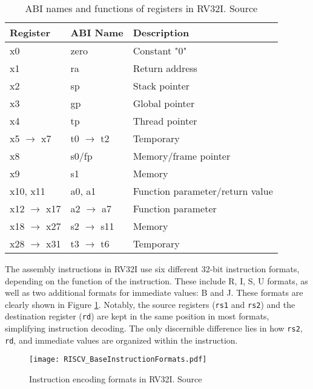 \begin{table}[h!]
    \centering
    \caption{ABI names and functions of registers in RV32I. Source \cite{riscv:manual:user:2024}}
    \label{tab:rv32i_registers}
    \begin{tabular}{lll}
    \toprule
    Register & ABI Name & Description \\
    \midrule
    x0 & zero & Constant "0" \\
    x1 & ra & Return address \\
    x2 & sp & Stack pointer \\
    x3 & gp & Global pointer \\
    x4 & tp & Thread pointer \\
    x5 $\to$ x7 & t0 $\to$ t2 & Temporary \\
    x8 & s0/fp & Memory/frame pointer \\
    x9 & s1 & Memory \\
    x10, x11 & a0, a1 & Function parameter/return value \\
    x12 $\to$ x17 & a2 $\to$ a7 & Function parameter \\
    x18 $\to$ x27 & s2 $\to$ s11 & Memory \\
    x28 $\to$ x31 & t3 $\to$ t6 & Temporary \\
    \bottomrule
    \end{tabular}
\end{table}

The assembly instructions in RV32I use six different 32-bit instruction formats, depending on the function of the instruction. These include R, I, S, U formats, as well as two additional formats for immediate values: B and J. These formats are clearly shown in Figure \ref{fig:rv32i_formats}. Notably, the source registers (\texttt{rs1} and \texttt{rs2}) and the destination register (\texttt{rd}) are kept in the same position in most formats, simplifying instruction decoding. The only discernible difference lies in how \texttt{rs2}, \texttt{rd}, and immediate values are organized within the instruction.

\begin{figure}[h!]
    \centering
    \texttt{[image: RISCV\_BaseInstructionFormats.pdf]}
    \caption{Instruction encoding formats in RV32I. Source \cite{riscv:manual:user:2024}}
    \label{fig:rv32i_formats}
\end{figure}

